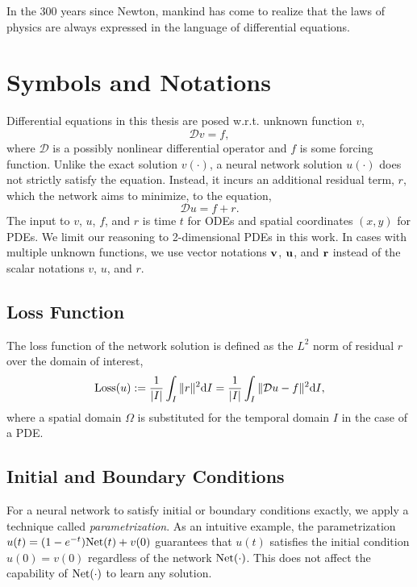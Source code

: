 \begin{savequote}[75mm]
    In the 300 years since Newton, mankind has come to realize that the laws of physics are always expressed in the language of differential equations.
\end{savequote}

\chapter{Symbols and Notations} \label{chapter:symbols-and-notations}
    Differential equations in this thesis are posed w.r.t. unknown function $v$,
    {
        \small
        \begin{equation}
            \mathcal{D} v = f,
        \end{equation}
    }
    where $\mathcal{D}$ is a possibly nonlinear differential operator and $f$ is some forcing function.
    Unlike the exact solution $v(\cdot)$, a neural network solution $u(\cdot)$ does not strictly satisfy the equation.
    Instead, it incurs an additional residual term, $r$, which the network aims to minimize, to the equation, 
    {
        \small
        \begin{equation}
            \mathcal{D} u = f + r.
        \end{equation}
    }
    The input to $v$, $u$, $f$, and $r$ is time $t$ for ODEs and spatial coordinates $(x, y)$ for PDEs.
    We limit our reasoning to 2-dimensional PDEs in this work.
    In cases with multiple unknown functions, we use vector notations $\mathbf{v}$, $\mathbf{u}$, and $\mathbf{r}$ instead of the scalar notations $v$, $u$, and $r$.

\section{Loss Function}
    The loss function of the network solution is defined as the $L^2$ norm of residual $r$ over the domain of interest,
    {
        \small
        \begin{align}
            \mathrm{Loss}{}(u) := \frac{1}{|I|} \int_{I} \|r\|^2 \mathrm{d}I = \frac{1}{|I|} \int_{I} \|\mathcal{D} u - f\|^2 \mathrm{d}I,
        \end{align}
    }
    where a spatial domain $\Omega$ is substituted for the temporal domain $I$ in the case of a PDE.

\section{Initial and Boundary Conditions}\label{section:initial-and-boundary-conditions}
    For a neural network to satisfy initial or boundary conditions exactly, we apply a technique called \textit{parametrization}. 
    As an intuitive example, the parametrization $u(t) = (1 - e^{-t}) \mathrm{Net}(t) + v(0)$ guarantees that $u(t)$ satisfies the initial condition $u(0)=v(0)$ regardless of the network $\mathrm{Net}(\cdot)$.
    This does not affect the capability of $\mathrm{Net}(\cdot)$ to learn any solution.

